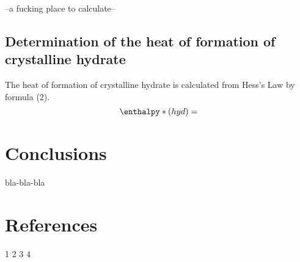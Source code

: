 \documentclass[12pt, letterpaper]{article}
\begin{document}
         --a fucking place to calculate--
        
         \subsection*{Determination of the heat of formation of crystalline hydrate}
         \hspace{4mm} The heat of formation of crystalline hydrate is calculated from Hess's Law by formula (2).
         \begin{equation}
            \enthalpy*(hyd){} = 
        \end{equation}

    \section*{Conclusions}
        bla-bla-bla















    
    \newpage

    \section*{References}
        1
        2
        3
        4
\end{document}
